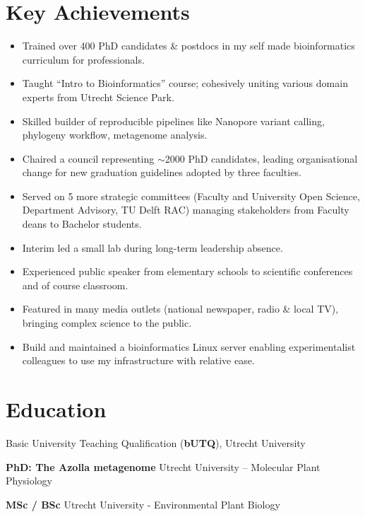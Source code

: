 \documentclass[a4paper,10pt]{article}
\begin{document}
{\begin{adjustbox}{valign=t}
\begin{minipage}[t]{0.6\textwidth}
\section*{Key Achievements}
\begin{itemize}
    \setlength{\itemindent}{0em}
    \setlength{\parindent}{5em}
  \item Trained over 400 PhD candidates \& postdocs in my self made bioinformatics curriculum for professionals.
  \item Taught “Intro to Bioinformatics” course; cohesively uniting various domain experts from Utrecht Science Park.
  \item Skilled builder of reproducible pipelines like Nanopore variant calling, phylogeny workflow, metagenome analysis.
  \item Chaired a council representing $\sim$2000 PhD candidates, leading organisational change for new graduation guidelines adopted by three faculties.
  \item Served on 5 more strategic committees (Faculty and University Open Science, Department Advisory, TU Delft RAC) managing stakeholders from Faculty deans to Bachelor students.
  \item Interim led a small lab during long-term leadership absence.
  \item Experienced public speaker from elementary schools to scientific conferences and of course classroom.
  \item Featured in many media outlets (national newspaper, radio \& local TV), bringing complex science to the public.
  \item Build and maintained a bioinformatics Linux server enabling experimentalist colleagues to use my infrastructure with relative ease.
\end{itemize}


\end{minipage}%
\end{adjustbox}%
}
\newpage

\section*{Education}
\begin{description}
\raggedright
\item[\normalfont \textcolor{ForestGreen}{\textbf{2022.}}] Basic University Teaching Qualification (\textbf{bUTQ}), Utrecht University
\item[\normalfont \textcolor{ForestGreen}{\textbf{2017 -- 2022.}}] \textbf{PhD: The Azolla metagenome} Utrecht University – Molecular Plant Physiology
\item[\normalfont \textcolor{ForestGreen}{\textbf{2010 -- 2017.}}] \textbf{MSc / BSc} Utrecht University - Environmental Plant Biology
\end{description}
\end{document}

